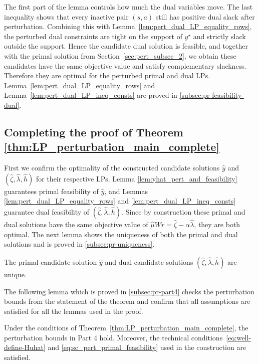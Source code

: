 \documentclass[mnsc,nonblindrev]{informs3}
\newcommand{\hhat}{\widehat{h}}
\newcommand{\muhat}{\widehat{\mu}}
\newcommand{\yhat}{\widehat{y}}
\newcommand{\zetahat}{\widehat{\zeta}}
\newcommand{\lambdahat}{\widehat{\lambda}}
\begin{document}
The first part of the lemma controls how much the dual variables move.
The last inequality shows that every inactive pair \((s,a)\) still has
positive dual slack after perturbation.
Combining this with Lemma~\ref{lem:pert_dual_LP_equality_rows}, the perturbed dual constraints are tight on
the support of \(y^\star\) and strictly slack outside the support.
Hence the candidate dual solution is feasible, and together with the
primal solution from Section~\ref{sec:pert_subsec_2}, we obtain these candidates have the same objective
value and satisfy complementary slackness. Therefore they are optimal for
the perturbed primal and dual LPs. Lemma~\ref{lem:pert_dual_LP_equality_rows} and Lemma~\ref{lem:pert_dual_LP_ineq_consts} are proved in \ref{subsec:pr-feasibility-dual}.
\subsection{Completing the proof of Theorem \ref{thm:LP_perturbation_main_complete}}\label{subsec:final-pr-perturbation-full}
First we confirm the optimality of the constructed candidate solutions $\yhat$ and $(\zetahat, \lambdahat, \hhat)$ for their respective LPs. 
Lemma \ref{lem:yhat_pert_and_feasibility} guarantees primal feasibility of $\yhat$, and Lemmas \ref{lem:pert_dual_LP_equality_rows} and \ref{lem:pert_dual_LP_ineq_consts} guarantee dual feasibility of $(\zetahat, \lambdahat, \hhat)$. Since by construction these primal and dual solutions have the same objective value of $\muhat W r = \zetahat - \alpha \lambdahat$, they are both optimal.
The next lemma shows the uniqueness of both the primal and dual solutions and is proved in \ref{subsec:pr-uniqueness}.
\begin{lemma}\label{lem:uniqueness}
    The primal candidate solution $\yhat$ and dual candidate solutions $(\zetahat, \lambdahat, \hhat)$ are unique.
\end{lemma}
The following lemma which is proved in \ref{subsec:pr-part4} checks the perturbation bounds from the statement of the theorem and confirm that all assumptions are satisfied for all the lemmas used in the proof.
\begin{lemma}
\label{lem:delta-smallness-consequences}
Under the conditions of Theorem~\ref{thm:LP_perturbation_main_complete},
the perturbation bounds in Part 4 hold.
Moreover, the technical conditions~\eqref{eq:well-define-Huhat} and
\eqref{eq:sc_pert_primal_feasibility} used in the construction are satisfied.
\end{lemma}
\end{document}
